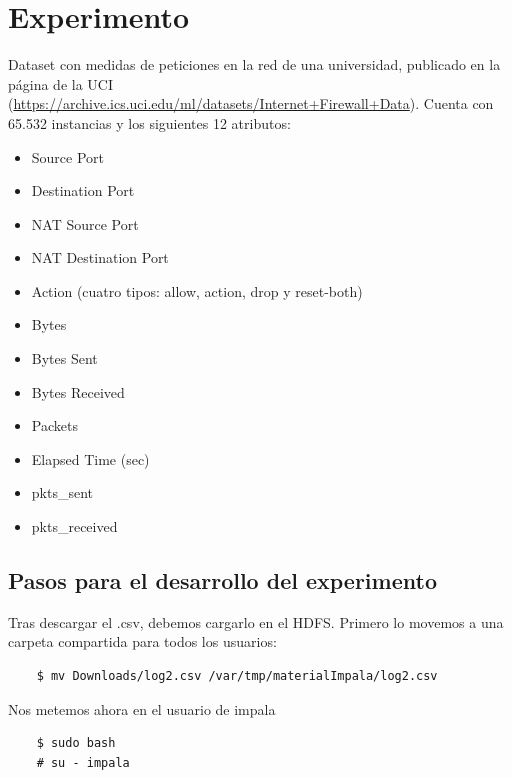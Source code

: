 \documentclass[13pt,a4paper]{article}
\begin{document}
    
    

    \newpage


\section{Experimento}

Dataset con medidas de peticiones en la red de una universidad, publicado en la página de la UCI (\url{https://archive.ics.uci.edu/ml/datasets/Internet+Firewall+Data}). Cuenta con 65.532 instancias y los siguientes 12 atributos:
\begin{itemize}
    \item Source Port
    \item Destination Port
    \item NAT Source Port
    \item NAT Destination Port
    \item Action (cuatro tipos: allow, action, drop y reset-both)
    \item Bytes
    \item Bytes Sent
    \item Bytes Received
    \item Packets
    \item Elapsed Time (sec)
    \item pkts\_sent
    \item pkts\_received
\end{itemize}

\subsection{Pasos para el desarrollo del experimento}

Tras descargar el .csv, debemos cargarlo en el HDFS.
Primero lo movemos a una carpeta compartida para todos los usuarios:
\begin{lstlisting}    
    $ mv Downloads/log2.csv /var/tmp/materialImpala/log2.csv
\end{lstlisting}

\vspace{\baselineskip}

Nos metemos ahora en el usuario de impala
\begin{lstlisting}
    $ sudo bash
    # su - impala
\end{lstlisting}
\end{document}
